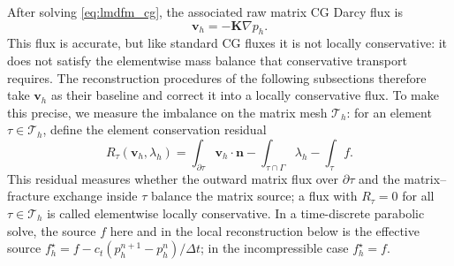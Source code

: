 \documentclass[a4paper,fleqn]{cas-sc}
\newcommand{\Kmat}{\mathbf{K}}
\newcommand{\vflux}{\mathbf{v}}
\begin{document}

After solving \eqref{eq:lmdfm_cg}, the associated raw matrix CG Darcy flux is
\begin{equation}
  \vflux_h=-\Kmat\nabla p_h .
  \label{eq:raw_cg_flux}
\end{equation}
This flux is accurate, but like standard CG fluxes it is not locally
conservative: it does not satisfy the elementwise mass balance that conservative
transport requires. The reconstruction procedures of the following subsections
therefore take \(\vflux_h\) as their baseline and correct it into a locally
conservative flux. To make this precise, we measure the imbalance on the matrix
mesh \(\mathcal{T}_h\): for an element \(\tau\in\mathcal{T}_h\), define the element
conservation residual
\begin{equation}
R_\tau(\vflux_h,\lambda_h)
=
\int_{\partial\tau}\vflux_h\cdot\mathbf{n}
-
\int_{\tau\cap\Gamma}\lambda_h
-
\int_\tau f .
\label{eq:element_residual}
\end{equation}
This residual measures whether the outward matrix flux over \(\partial\tau\) and
the matrix--fracture exchange inside \(\tau\) balance the matrix source; a flux
with \(R_\tau=0\) for all \(\tau\in\mathcal{T}_h\) is called elementwise locally
conservative. In a time-discrete parabolic solve, the source \(f\) here and in the
local reconstruction below is the effective source
\(f_h^\star=f-c_t(p_h^{n+1}-p_h^n)/\Delta t\); in the incompressible case
\(f_h^\star=f\).
\end{document}
